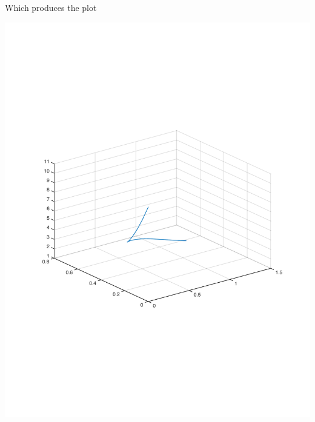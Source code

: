 \documentclass[11pt]{article}
\begin{document}
\begin{itemize}
        Which produces the plot
        \begin{center}
        \includegraphics[width=\linewidth]{2c}
        \end{center}

\end{itemize}
\end{document}
